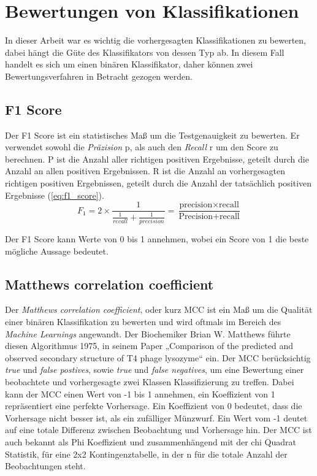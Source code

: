 \section{Bewertungen von Klassifikationen}

In dieser Arbeit war es wichtig die vorhergesagten Klassifikationen zu bewerten, dabei hängt die Güte des Klassifikators von dessen Typ ab. In diesem Fall handelt es sich um einen binären Klassifikator, daher können zwei Bewertungsverfahren in Betracht gezogen werden.

\subsection{F1 Score}
Der F1 Score ist ein statistisches Maß um die Testgenauigkeit zu bewerten. Er verwendet sowohl die \emph{Präzision} p, als auch den \emph{Recall} r um den Score zu berechnen. P ist die Anzahl aller richtigen positiven Ergebnisse, geteilt durch die Anzahl an allen positiven Ergebnissen. R ist die Anzahl an vorhergesagten richtigen positiven Ergebnissen, geteilt durch die Anzahl der tatsächlich positiven Ergebnisse (\ref{eq:f1_score}). 
\begin{equation}
    F_{1} = 2 \times \frac{1}{\frac{1}{recall}+\frac{1}{precision}} = \frac{\text{precision} \times \text{recall}}{\text{Precision} + \text{recall}}
    \label{eq:f1_score}
\end{equation}

Der F1 Score kann Werte von 0 bis 1 annehmen, wobei ein Score von 1 die beste mögliche Aussage bedeutet.


\subsection{Matthews correlation coefficient}

Der \emph{Matthews correlation coefficient}, oder kurz MCC ist ein Maß um die Qualität einer binären Klassifikation zu bewerten und wird oftmals im Bereich des \emph{Machine Learnings} angewandt. Der Biochemiker Brian W. Matthews führte diesen Algorithmus 1975, in seinem Paper „Comparison of the predicted and observed secondary structure of T4 phage lysozyme“\cite{Matthews.1975} ein. Der MCC berücksichtig \emph{true} und \emph{false postives}, sowie \emph{true} und \emph{false negatives}, um eine Bewertung einer beobachtete und vorhergesagte zwei Klassen Klassifizierung zu treffen. Dabei kann der MCC einen Wert von -1 bis 1 annehmen, ein Koeffizient von 1 repräsentiert eine perfekte Vorhersage. Ein Koeffizient von 0 bedeutet, dass die Vorhersage nicht besser ist, als ein zufälliger Münzwurf. Ein Wert vom -1 deutet auf eine totale Differenz zwischen Beobachtung und Vorhersage hin. Der MCC ist auch bekannt als Phi Koeffizient und zusammenhängend mit der chi Quadrat Statistik, für eine 2x2 Kontingenztabelle, in der n für die totale Anzahl der Beobachtungen steht.

